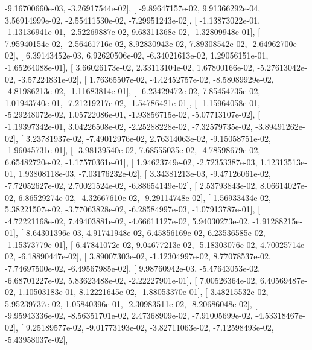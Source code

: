 \documentclass{article}
\begin{document}
         -9.16700660e-03,  -3.26917544e-02],
       [ -9.89647157e-02,   9.91366292e-04,   3.56914999e-02,
         -2.55411530e-02,  -7.29951243e-02],
       [ -1.13873022e-01,  -1.13136941e-01,  -2.52269887e-02,
          9.68311368e-02,  -1.32809948e-01],
       [  7.95940154e-02,  -2.56461716e-02,   8.92830943e-02,
          7.89308542e-02,  -2.64962700e-02],
       [  6.39143452e-03,   6.92620506e-02,  -6.34021613e-02,
          1.29056151e-01,  -1.65264088e-01],
       [  3.66026173e-02,   2.33113104e-02,   1.67800166e-02,
         -5.27613042e-02,  -3.57224831e-02],
       [  1.76365507e-02,  -4.42452757e-02,  -8.58089929e-02,
         -4.81986213e-02,  -1.11683814e-01],
       [ -6.23429472e-02,   7.85454735e-02,   1.01943740e-01,
         -7.21219217e-02,  -1.54786421e-01],
       [ -1.15964058e-01,  -5.29248072e-02,   1.05722086e-01,
         -1.93856715e-02,  -5.07713107e-02],
       [ -1.19397342e-01,   3.04226508e-02,  -2.25288228e-02,
         -7.32579735e-02,  -3.89491262e-02],
       [  3.23781937e-02,  -7.49012976e-02,   2.76314063e-02,
         -9.15058751e-02,  -1.96045731e-01],
       [ -3.98139540e-02,   7.68555035e-02,  -4.78598679e-02,
          6.65482720e-02,  -1.17570361e-01],
       [  1.94623749e-02,  -2.72353387e-03,   1.12313513e-01,
          1.93808118e-03,  -7.03176232e-02],
       [  3.34381213e-03,  -9.47126061e-02,  -7.72052627e-02,
          2.70021524e-02,  -6.88654149e-02],
       [  2.53793843e-02,   8.06614027e-02,   6.86529274e-02,
         -4.32667610e-02,  -9.29114748e-02],
       [  1.56933434e-02,   5.38221507e-02,  -3.77063828e-02,
         -6.28584997e-03,  -1.07913787e-01],
       [ -4.72221168e-02,   7.49403881e-02,  -4.66611127e-02,
          5.94030273e-02,  -1.91288215e-01],
       [  8.64301396e-03,   4.91741948e-02,   6.45856169e-02,
          6.23536585e-02,  -1.15373779e-01],
       [  6.47841072e-02,   9.04677213e-02,  -5.18303076e-02,
          4.70025714e-02,  -6.18890447e-02],
       [  3.89007303e-02,  -1.12304997e-02,   8.77078537e-02,
         -7.74697500e-02,  -6.49567985e-02],
       [  9.98760942e-03,  -5.47643053e-02,  -6.68701227e-02,
          5.83623488e-02,  -2.22227901e-01],
       [  7.00526364e-02,   6.40569487e-02,   1.10503183e-01,
          8.12221645e-02,  -1.88053370e-01],
       [  3.48215532e-02,   5.95239737e-02,   1.05840396e-01,
         -2.30983511e-02,  -8.20686048e-02],
       [ -9.95943336e-02,  -8.56351701e-02,   2.47368909e-02,
         -7.91005699e-02,  -4.53318467e-02],
       [  9.25189577e-02,  -9.01773193e-02,  -3.82711063e-02,
         -7.12598493e-02,  -5.43958037e-02],
\end{document}
